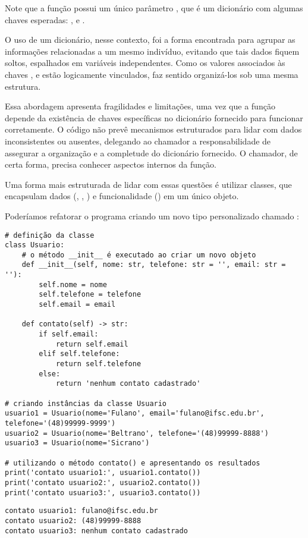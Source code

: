 Note que a função  possui um único parâmetro , que é um dicionário com
algumas chaves esperadas: ,  e .

O uso de um dicionário, nesse contexto, foi a forma encontrada para agrupar as informações relacionadas a um mesmo
indivíduo, evitando que tais dados fiquem soltos, espalhados em variáveis independentes.
Como os valores associados às chaves ,  e  estão logicamente vinculados,
faz sentido organizá-los sob uma mesma estrutura.

Essa abordagem apresenta fragilidades e limitações, uma vez que a função 
depende da existência de chaves específicas no dicionário fornecido para funcionar corretamente.
O código não prevê mecanismos estruturados para lidar com dados inconsistentes ou ausentes, delegando ao chamador a
responsabilidade de assegurar a organização e a completude do dicionário fornecido.
O chamador, de certa forma, precisa conhecer aspectos internos da função.

Uma forma mais estruturada de lidar com essas questões é utilizar classes, que encapsulam dados
(, , ) e funcionalidade () em um único objeto.


Poderíamos refatorar o programa criando um novo tipo personalizado chamado :
\begin{verbatim}
# definição da classe
class Usuario:
    # o método __init__ é executado ao criar um novo objeto
    def __init__(self, nome: str, telefone: str = '', email: str = ''):
        self.nome = nome
        self.telefone = telefone
        self.email = email

    def contato(self) -> str:
        if self.email:
            return self.email
        elif self.telefone:
            return self.telefone
        else:
            return 'nenhum contato cadastrado'

# criando instâncias da classe Usuario
usuario1 = Usuario(nome='Fulano', email='fulano@ifsc.edu.br', telefone='(48)99999-9999')
usuario2 = Usuario(nome='Beltrano', telefone='(48)99999-8888')
usuario3 = Usuario(nome='Sicrano')

# utilizando o método contato() e apresentando os resultados
print('contato usuario1:', usuario1.contato())
print('contato usuario2:', usuario2.contato())
print('contato usuario3:', usuario3.contato())
\end{verbatim}
\begin{verbatim}
contato usuario1: fulano@ifsc.edu.br
contato usuario2: (48)99999-8888
contato usuario3: nenhum contato cadastrado
\end{verbatim}

